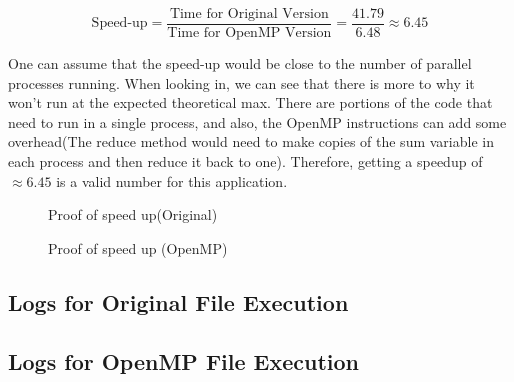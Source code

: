 \documentclass{article}
\newcommand{\zonenorm}{\textit{$Z$-score normalization}}
\begin{document}
\[
    \text{Speed-up} = \frac{\text{Time for Original Version}}{\text{Time for OpenMP Version}} = \frac{41.79}{6.48} \approx 6.45
\]

One can assume that the speed-up would be close to the number of parallel processes running. When looking in, we can see that there is more to why it won't run at the expected theoretical max. There are portions of the code that need to run in a single process, and also, the OpenMP instructions can add some overhead(The reduce method would need to make copies of the sum variable in each process and then reduce it back to one).
Therefore, getting a speedup of $\approx 6.45 $ is a valid number for this application.




\begin{figure}[h]
    \centering
    \begin{minipage}{0.48\textwidth}
        \centering
        \caption{Proof of speed up(Original)}
        \label{fig: prof of speed up}
    \end{minipage}
    \hfill
    \begin{minipage}{0.48\textwidth}
        \centering
        \caption{Proof of speed up (OpenMP) }
        \label{fig: prof of speed up 2}
    \end{minipage}
\end{figure}

\clearpage
\begin{scriptsize}
    \subsection{Logs for Original File Execution} \label{sec: original logs}

    \clearpage
    \subsection{Logs for OpenMP File Execution} \label{sec: OpenMP logs}
\end{scriptsize}
\end{document}
